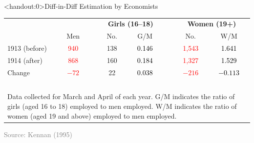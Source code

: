 \documentclass[10pt,xcolor=table,ignorenonframetext,handout,aspectratio=169]{beamer}
\begin{document}

\begin{frame}<handout:0>{Diff-in-Diff Estimation by Economists}

\medskip
\begin{center}
	\begin{center}
		\begin{footnotesize}
			\begingroup
			\setlength{\tabcolsep}{2pt} %
			\renewcommand{\arraystretch}{1.6} %
			\begin{tabular}{lccccccc}
				\hline
				& & & \multicolumn{2}{c}{\textbf{Girls (16--18)}} & & \multicolumn{2}{c}{\textbf{Women (19+)}} \\ \cline{4-5} \cline{7-8}	
				& Men & & No. & G/M & & No. & W/M \\ \hline
				1913 (before)	& \textcolor{red}{940} & & 138 & \textcolor{black}{0.146} & & \textcolor{red}{1,543}	& \textcolor{black}{1.641} \\
				1914 (after) 	& \textcolor{red}{868} & & 160 & \textcolor{black}{0.184} & & \textcolor{red}{1,327} & \textcolor{black}{1.529} \\
				Change						& \textcolor{red}{$-72$}	& & 22  & \textcolor{black}{0.038} & & \textcolor{red}{$-216$} & \textcolor{black}{$-0.113$} \\ \hline 
				 & & & \multicolumn{1}{p{1cm}}{$\ $} & \multicolumn{1}{p{1cm}}{$\ $} & & \multicolumn{1}{p{1cm}}{$\ $} & \multicolumn{1}{p{1cm}}{$\ $} \\ [-2.2em]
				\multicolumn{8}{p{7.2cm}}{\tiny{Data collected for March and April of each year.  G/M indicates the ratio of girls (aged 16 to 18) employed to men employed. W/M indicates the ratio of women (aged 19 and above) employed to men employed. }} \\
			\end{tabular}
			\endgroup
		\end{footnotesize}
	\end{center}
	
	\smallskip
	
	\textcolor{gray}{\tiny{Source:  Kennan (1995)}}
\end{center}

\end{frame}
\end{document}
